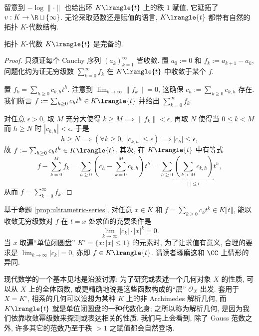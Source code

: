 留意到 $-\log \|\cdot\|$ 也给出环 $K\lrangle{t}$ 上的秩 $1$ 赋值, 它延拓了 $v: K \to \R \sqcup \{\infty\}$. 无论采取范数还是赋值的语言, $K\lrangle{t}$ 都带有自然的拓扑 $K$-代数结构.

\begin{lemma}\label{prop:strictly-convergent-series-2}
	拓扑 $K$-代数 $K\lrangle{t}$ 是完备的.
\end{lemma}
\begin{proof}
	只须证每个 Cauchy 序列 $(a_k)_{k=1}^\infty$ 皆收敛. 置 $a_0 := 0$ 和 $f_k := a_{k+1}-a_k$, 问题化约为证无穷级数 $\sum_{k=0}^\infty f_k$ 在 $K\lrangle{t}$ 中收敛于某个 $f$.
	
	置 $f_k = \sum_{h \geq 0} c_{k,h} t^h$. 注意到 $\lim_{k \to \infty} \|f_k\| = 0$, 这确保 $c_h := \sum_{k \geq 0} c_{k,h}$ 存在. 我们断言 $f := \sum_{h \geq 0} c_h t^h \in K\lrangle{t}$ 并给出 $\sum_{k=0}^\infty f_k$.
	
	对任意 $\epsilon > 0$, 取 $M$ 充分大使得 $k \geq M \implies \|f_k\| < \epsilon$, 再取 $N$ 使得当 $0 \leq k < M$ 而 $h \geq N$ 时 $|c_{k,h}| < \epsilon$. 于是
	\[ h \geq N \implies \left( \forall k \geq 0, \; |c_{k,h}| \leq \epsilon \right) \implies |c_h| \leq \epsilon, \]
	故 $f := \sum_{h \geq 0} c_h t^h \in K\lrangle{t}$. 其次, 在 $K\lrangle{t}$ 中有等式
	\[ f - \sum_{k=0}^M f_k = \sum_{h \geq 0} \left( c_h - \sum_{k=0}^M c_{k,h} \right) t^h = \sum_{h \geq 0} \underbracket{ \left( \sum_{k > M} c_{k,h} \right)}_{|\cdot| \leq \epsilon} t^h , \]
	从而 $f = \sum_{k=0}^\infty f_k$.
\end{proof}

\begin{remark}
	基于命题 \ref{prop:ultrametric-series}, 对任意 $x \in K$ 和 $f = \sum_{k \geq 0} c_k t^k \in K\llbracket t \rrbracket$, 能以收敛无穷级数对 $f$ 在 $t=x$ 处求值的充要条件是
	\[ \lim_{k \to \infty} |c_k| \cdot |x|^k = 0. \]
	当 $x$ 取遍``单位闭圆盘'' $K^\circ = \{x : |x| \leq 1 \}$ 的元素时, 为了让求值有意义, 合理的要求是 $\lim_{k \to \infty} |c_k| = 0$, 亦即 $f \in K\lrangle{t}$. 请读者琢磨这和 $\CC$ 上情形的异同.
	
	现代数学的一个基本见地是沿波讨源: 为了研究或表述一个几何对象 $X$ 的性质, 可以从 $X$ 上的全体函数, 或更精确地说是这些函数构成的``层'' $\mathcal{O}_X$ 出发. 套用于 $X = K^\circ$, 相系的几何可以设想为某种 $K$ 上的非 Archimedes 解析几何, 而 $K\lrangle{t}$ 就是单位闭圆盘的一种代数化身; 之所以称为解析几何, 是因为我们依靠收敛幂级数来探测或表达相关的性质. 我们马上会看到, 除了 Gauss 范数之外, 许多其它的范数乃至于秩 $> 1$ 之赋值都会自然登场. 
\end{remark}

